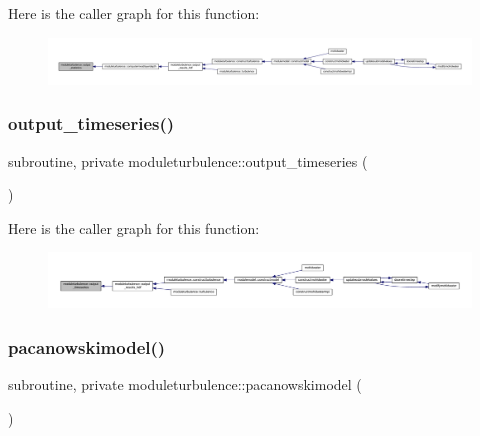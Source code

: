 Here is the caller graph for this function\+:\nopagebreak
\begin{figure}[H]
\begin{center}
\leavevmode
\includegraphics[width=350pt]{namespacemoduleturbulence_a217345ed46e74ae2c1880a07108c9487_icgraph}
\end{center}
\end{figure}
\mbox{\label{namespacemoduleturbulence_ad434d19fe537a51091b39515c951a2a3}} 
\subsubsection{\texorpdfstring{output\+\_\+timeseries()}{output\_timeseries()}}
{\footnotesize\ttfamily subroutine, private moduleturbulence\+::output\+\_\+timeseries (\begin{DoxyParamCaption}{ }\end{DoxyParamCaption})\hspace{0.3cm}{\ttfamily [private]}}

Here is the caller graph for this function\+:\nopagebreak
\begin{figure}[H]
\begin{center}
\leavevmode
\includegraphics[width=350pt]{namespacemoduleturbulence_ad434d19fe537a51091b39515c951a2a3_icgraph}
\end{center}
\end{figure}
\mbox{\label{namespacemoduleturbulence_ac17c49932990b363ac1d4fc06653ff7a}} 
\subsubsection{\texorpdfstring{pacanowskimodel()}{pacanowskimodel()}}
{\footnotesize\ttfamily subroutine, private moduleturbulence\+::pacanowskimodel (\begin{DoxyParamCaption}{ }\end{DoxyParamCaption})\hspace{0.3cm}{\ttfamily [private]}}

